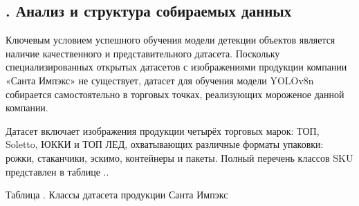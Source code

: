 \setcounter{chaptercntr}{3}


\subtitlespace

\subsection*{ 
  \gostTitleFont
  \redline
  \thechaptercntr .\thesubchaptercntr \spc
  Анализ и структура собираемых данных
} \addtocounter{subchaptercntr}{1}

\subtitlespace

{\gostFont

  \par \redline Ключевым условием успешного обучения модели детекции объектов является наличие качественного и представительного датасета. Поскольку специализированных открытых датасетов с изображениями продукции компании «Санта Импэкс» не существует, датасет для обучения модели YOLOv8n собирается самостоятельно в торговых точках, реализующих мороженое данной компании.

  \par \redline Датасет включает изображения продукции четырёх торговых марок: ТОП, Soletto, ЮККИ и ТОП ЛЕД, охватывающих различные форматы упаковки: рожки, стаканчики, эскимо, контейнеры и пакеты. Полный перечень классов SKU представлен в таблице \thechaptercntr .\thetablecntr.

  \topTablespace
  {\begin{Center}
    \par \gostFont Таблица \thechaptercntr .\thetablecntr \spc {--} Классы датасета продукции Санта Импэкс


\end{Center}}}
